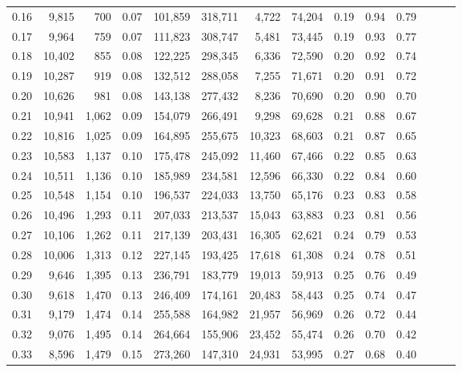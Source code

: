 \begin{tabular}{rrrrrrrrrrrrrr}
0.16 &   9,815 &    700 &  0.07 &  101,859 &  318,711 &   4,722 &  74,204 &  0.19 &  0.94 &      0.79 \\
0.17 &   9,964 &    759 &  0.07 &  111,823 &  308,747 &   5,481 &  73,445 &  0.19 &  0.93 &      0.77 \\
0.18 &  10,402 &    855 &  0.08 &  122,225 &  298,345 &   6,336 &  72,590 &  0.20 &  0.92 &      0.74 \\
0.19 &  10,287 &    919 &  0.08 &  132,512 &  288,058 &   7,255 &  71,671 &  0.20 &  0.91 &      0.72 \\
0.20 &  10,626 &    981 &  0.08 &  143,138 &  277,432 &   8,236 &  70,690 &  0.20 &  0.90 &      0.70 \\
0.21 &  10,941 &  1,062 &  0.09 &  154,079 &  266,491 &   9,298 &  69,628 &  0.21 &  0.88 &      0.67 \\
0.22 &  10,816 &  1,025 &  0.09 &  164,895 &  255,675 &  10,323 &  68,603 &  0.21 &  0.87 &      0.65 \\
0.23 &  10,583 &  1,137 &  0.10 &  175,478 &  245,092 &  11,460 &  67,466 &  0.22 &  0.85 &      0.63 \\
0.24 &  10,511 &  1,136 &  0.10 &  185,989 &  234,581 &  12,596 &  66,330 &  0.22 &  0.84 &      0.60 \\
0.25 &  10,548 &  1,154 &  0.10 &  196,537 &  224,033 &  13,750 &  65,176 &  0.23 &  0.83 &      0.58 \\
0.26 &  10,496 &  1,293 &  0.11 &  207,033 &  213,537 &  15,043 &  63,883 &  0.23 &  0.81 &      0.56 \\
0.27 &  10,106 &  1,262 &  0.11 &  217,139 &  203,431 &  16,305 &  62,621 &  0.24 &  0.79 &      0.53 \\
0.28 &  10,006 &  1,313 &  0.12 &  227,145 &  193,425 &  17,618 &  61,308 &  0.24 &  0.78 &      0.51 \\
0.29 &   9,646 &  1,395 &  0.13 &  236,791 &  183,779 &  19,013 &  59,913 &  0.25 &  0.76 &      0.49 \\
0.30 &   9,618 &  1,470 &  0.13 &  246,409 &  174,161 &  20,483 &  58,443 &  0.25 &  0.74 &      0.47 \\
0.31 &   9,179 &  1,474 &  0.14 &  255,588 &  164,982 &  21,957 &  56,969 &  0.26 &  0.72 &      0.44 \\
0.32 &   9,076 &  1,495 &  0.14 &  264,664 &  155,906 &  23,452 &  55,474 &  0.26 &  0.70 &      0.42 \\
0.33 &   8,596 &  1,479 &  0.15 &  273,260 &  147,310 &  24,931 &  53,995 &  0.27 &  0.68 &      0.40 \\

\end{tabular}
